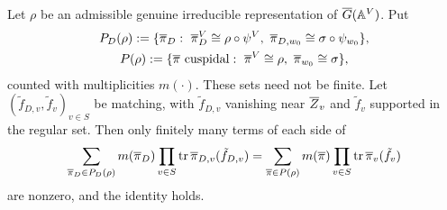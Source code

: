 \begin{proposition}\label{I:prop:packet}
Let $\rho$ be an admissible genuine irreducible representation of $\overline{G}(\mathbb{A}^V)$. Put
\begin{gather*} P_D(\rho):=\{\pib_D:\ \pib_D^V\cong\rho\circ\psi^V,\ \pib_{D,w_0}\cong\sigma\circ\psi_{w_0}\},\\ P(\rho):=\{\pib\ \mathrm{cuspidal}:\ \pib^V\cong\rho,\ \pib_{w_0}\cong\sigma\}, \end{gather*}
counted with multiplicities $m(\cdot)$. These sets need not be finite. Let $(\tilde f_{D,v},\tilde f_v)_{v\in S}$ be matching, with $\tilde f_{D,v}$ vanishing near $\overline{Z}_v$ and $\tilde f_v$ supported in the regular set. Then only finitely many terms of each side of
\begin{equation}\label{I:eq:packet}
\sum_{\overline{\pi}_D\in P_D(\rho)}m(\overline{\pi}_D)\prod_{v\in S}\operatorname{tr}\overline{\pi}_{D,v}(\tilde f_{D,v})=\sum_{\overline{\pi}\in P(\rho)}m(\overline{\pi})\prod_{v\in S}\operatorname{tr}\overline{\pi}_v(\tilde f_v)
\end{equation}
are nonzero, and the identity holds.
\end{proposition}

